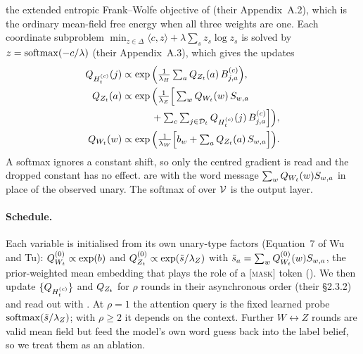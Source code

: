 %
the extended entropic Frank--Wolfe objective of \citet{wu2023probabilistic} (their
Appendix~A.2), which is the ordinary mean-field free energy when all three weights are one.
Each coordinate subproblem $\min_{z\in\Delta}\langle c,z\rangle + \lambda\sum_s z_s\log z_s$ is
solved by $z = \operatorname{softmax}(-c/\lambda)$ (their Appendix~A.3), which gives the updates
%
\begin{align}
\label{eq:full-update-H}
  Q_{H_{t}^{(c)}}(j) &\propto \exp\Big(\tfrac{1}{\lambda_H}
      \textstyle\sum_a Q_{Z_{t}}(a)\,B^{(c)}_{j,a}\Big),\\
\label{eq:full-update-Z}
  Q_{Z_{t}}(a) &\propto \exp\Big(\tfrac{1}{\lambda_Z}\Big[
      \textstyle\sum_w Q_{W_{t}}(w)\,S_{w,a}\\
    &\qquad\quad + \textstyle\sum_c\sum_{j\in\mathcal{D}_{t}}
      Q_{H_{t}^{(c)}}(j)\,B^{(c)}_{j,a}\Big]\Big),\nonumber\\
\label{eq:full-update-W}
  Q_{W_{t}}(w) &\propto \exp\Big(\tfrac{1}{\lambda_W}\Big[
      b_w + \textstyle\sum_a Q_{Z_{t}}(a)\,S_{w,a}\Big]\Big).
\end{align}
%
A softmax ignores a constant shift, so only the centred gradient is read and the dropped
constant has no effect.  are
 with the word message $\sum_w Q_{W_{t}}(w)S_{w,a}$ in place of
the observed unary. The softmax of  over $\mathcal{V}$ is the output layer.

\paragraph{Schedule.}
Each variable is initialised from its own unary-type factors (Equation~7 of Wu and Tu):
$Q_{W_{t}}^{(0)} \propto \exp(b)$ and $Q_{Z_{t}}^{(0)} \propto \exp(\tilde{s}/\lambda_Z)$ with
$\tilde{s}_a = \sum_w Q_{W_{t}}^{(0)}(w)S_{w,a}$, the prior-weighted mean embedding that plays
the role of a \textsc{[mask]} token (). We then update $\{Q_{H_{t}^{(c)}}\}$ and $Q_{Z_{t}}$ for $\rho$ rounds in their
asynchronous order (their \S2.3.2) and read out with . At $\rho=1$ the
attention query is the fixed learned probe $\operatorname{softmax}(\tilde{s}/\lambda_Z)$; with $\rho \ge 2$ it
depends on the context. Further $W\!\leftrightarrow\!Z$ rounds are valid mean field but feed the
model's own word guess back into the label belief, so we treat them as an ablation.

